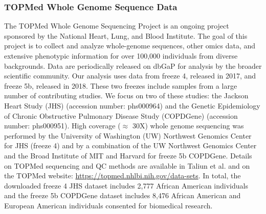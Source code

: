 \documentclass[12pt]{article}
\begin{document}
\subsubsection{TOPMed Whole Genome Sequence Data}

The TOPMed Whole Genome Sequencing Project is an ongoing project sponsored by the National Heart, Lung, and Blood Institute.
The goal of this project is to collect and analyze whole-genome sequences, other omics data, and extensive phenotypic information for over 100,000 individuals from diverse backgrounds. 
Data are periodically released on dbGaP for analysis by the broader scientific community. 
Our analysis uses data from freeze 4, released in 2017, and freeze 5b, released in 2018.
These two freezes include samples from a large number of contributing studies.
We focus on two of these studies: the Jackson Heart Study (JHS) (accession number: phs000964) and the Genetic Epidemiology of Chronic Obstructive Pulmonary Disease Study (COPDGene) (accession number: phs000951).
High coverage ($\approx$ 30X) whole genome sequencing was performed by the University of Washington (UW) Northwest Genomics Center for JHS (freeze 4) and by a combination of the UW Northwest Genomics Center and the Broad Institute of MIT and Harvard for freeze 5b COPDGene.
Details on TOPMed sequencing and QC methods are available in Taliun et al. \citep{taliun2021} and on the TOPMed website: \href{https://topmed.nhlbi.nih.gov/data-sets}{https://topmed.nhlbi.nih.gov/data-sets}.
In total, the downloaded freeze 4 JHS dataset includes 2,777 African American individuals and the freeze 5b COPDGene dataset includes 8,476 African American and European American individuals consented for biomedical research.
\end{document}
